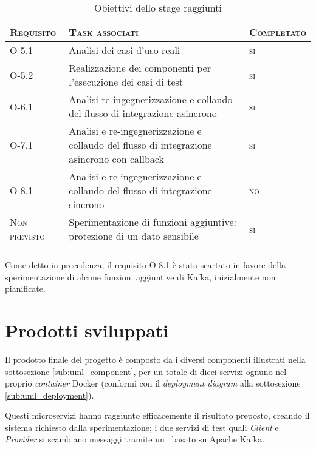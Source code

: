 \onehalfspacing
\begin{small}
  \begin{center}
    \centering
    \renewcommand\arraystretch{1.6}
    \begin{longtable}{| >{\centering\arraybackslash}m{2cm}|m{9.5cm}|>{\centering\arraybackslash}m{2.2cm}|}
      \hline
      \textsc{\textbf{Requisito}} & \textsc{\textbf{Task associati}} & \textsc{\textbf{Completato}} \\
      \hline
      O-5.1 & Analisi dei casi d'uso reali & \textsc{si} \\
      \hline
      O-5.2 & Realizzazione dei componenti per l'esecuzione dei casi di test & \textsc{si}\\
      \Xhline{2\arrayrulewidth}
      O-6.1 & Analisi re-ingegnerizzazione e collaudo del flusso di integrazione asincrono & \textsc{si} \\
      \Xhline{2\arrayrulewidth}
      O-7.1 & Analisi e re-ingegnerizzazione e collaudo del flusso di integrazione asincrono con callback & \textsc{si}\\
      \Xhline{2\arrayrulewidth}
      O-8.1 & Analisi e re-ingegnerizzazione e collaudo del flusso di integrazione sincrono & \textsc{no}\\
      \hline
      \textsc{Non previsto} & Sperimentazione di funzioni aggiuntive: protezione di un dato sensibile & \textsc{si}\\
      \hline

      \caption{Obiettivi dello stage raggiunti}
    \end{longtable}
  \end{center}
\end{small}

Come detto in precedenza, il requisito O-8.1 è stato scartato in favore della sperimentazione di alcune funzioni aggiuntive di Kafka, inizialmente non pianificate.

\section{Prodotti sviluppati}

Il prodotto finale del progetto è composto da i diversi componenti illustrati nella sottosezione \ref{sub:uml_component}, per un totale di dieci servizi ognuno nel proprio
\textit{container} Docker (conformi con il \textit{deployment diagram} alla sottosezione \ref{sub:uml_deployment}).

Questi microservizi hanno raggiunto efficacemente il risultato preposto, creando il sistema richiesto dalla sperimentazione; i due servizi di test quali  \textit{Client} e  \textit{Provider} si scambiano messaggi tramite un \middleware\ basato su Apache Kafka.


